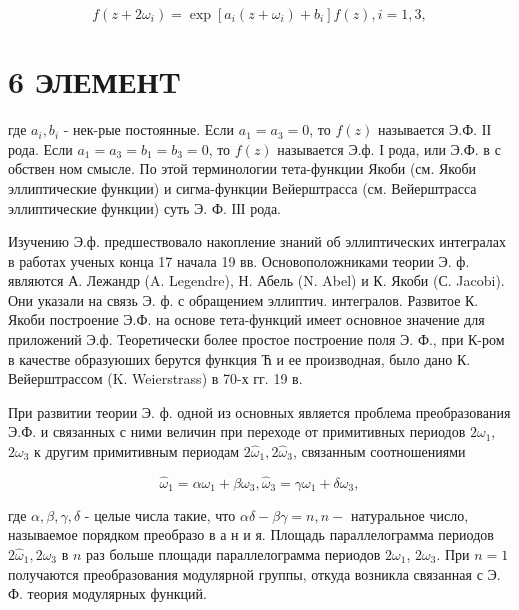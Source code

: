 \documentclass[10pt]{article}
\begin{document}
\[

f\left(z+2 \omega_{i}\right)=\exp \left[a_{i}\left(z+\omega_{i}\right)+b_{i}\right] f(z), i=1,3,

\]



\section{6 ЭЛЕМЕНT}

где $a_{i}, b_{i}$ - нек-рые постоянные. Если $a_{1}=a_{3}=0$, то $f(z)$ называется Э.Ф. ІІ рода. Если $a_{1}=a_{3}=b_{1}=b_{3}=0$, то $f(z)$ называется Э.ф. І рода, или Э.Ф. в с обствен ном смысле. По этой терминологии тета-функции Якоби (см. Якоби эллиптические функции) и сигма-функции Вейерштрасса (см. Вейерштрасса эллиптические функции) суть Э. Ф. ІІІ рода.



Изучению Э.ф. предшествовало накопление знаний об эллиптических интегралах в работах ученых конца 17 начала 19 вв. Основоположниками теории Э. ф. являются А. Лежандр (A. Legendre), Н. Абель (N. Abel) и К. Якоби (С. Jacobi). Они указали на связь Э. ф. с обращением эллиптич. интегралов. Развитое К. Якоби построение Э.Ф. на основе тета-функций имеет основное значение для приложений Э.ф. Теоретически более простое построение поля Э. Ф., при К-ром в качестве образуюших берутся функция Ћ и ее производная, было дано К. Вейерштрассом (K. Weierstrass) в 70-х гг. 19 в.



При развитии теории Э. ф. одной из основных является проблема преобразования Э.Ф. и связанных с ними величин при переходе от примитивных периодов $2 \omega_{1}$, $2 \omega_{3}$ к другим примитивным периодам $2 \hat{\omega}_{1}, 2 \hat{\omega}_{3}$, связанным соотношениями



\[

\hat{\omega}_{1}=\alpha \omega_{1}+\beta \omega_{3}, \hat{\omega}_{3}=\gamma \omega_{1}+\delta \omega_{3},

\]



где $\alpha, \beta, \gamma, \delta$ - целые числа такие, что $\alpha \delta-\beta \gamma=n, n-$ натуральное число, называемое порядком преобразо в а н и я. Площадь параллелограмма периодов $2 \hat{\omega}_{1}, 2 \hat{\omega}_{3}$ в $n$ раз больше площади параллелограмма периодов $2 \omega_{1}$, $2 \omega_{3}$. При $n=1$ получаются преобразования модулярной группы, откуда возникла связанная с Э. Ф. теория модулярных функций.
\end{document}
